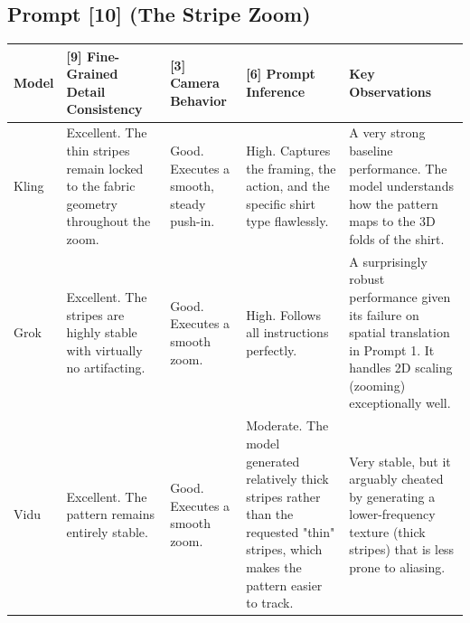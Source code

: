 \documentclass[sigconf]{acmart}
\begin{document}
\subsection*{Prompt [10] (The Stripe Zoom)}
\begin{table}[t]
    \centering
    \renewcommand{\arraystretch}{1.3}
    \begin{tabularx}{\textwidth}{| l | >{\raggedright\arraybackslash}X | >{\raggedright\arraybackslash}X | >{\raggedright\arraybackslash}X | >{\raggedright\arraybackslash}X |}
        \hline
        \textbf{Model} & \textbf{[9] Fine-Grained Detail Consistency}                                                                                                            & \textbf{[3] Camera Behavior}                                                                               & \textbf{[6] Prompt Inference}                                                                                                             & \textbf{Key Observations}                                                                                                                        \\ \hline
        Kling          & Excellent. The thin stripes remain locked to the fabric geometry throughout the zoom.                                                                   & Good. Executes a smooth, steady push-in.                                                                   & High. Captures the framing, the action, and the specific shirt type flawlessly.                                                           & A very strong baseline performance. The model understands how the pattern maps to the 3D folds of the shirt.                                     \\ \hline
        Grok           & Excellent. The stripes are highly stable with virtually no artifacting.                                                                                 & Good. Executes a smooth zoom.                                                                              & High. Follows all instructions perfectly.                                                                                                 & A surprisingly robust performance given its failure on spatial translation in Prompt 1. It handles 2D scaling (zooming) exceptionally well.      \\ \hline
        Vidu           & Excellent. The pattern remains entirely stable.                                                                                                         & Good. Executes a smooth zoom.                                                                              & Moderate. The model generated relatively thick stripes rather than the requested "thin" stripes, which makes the pattern easier to track. & Very stable, but it arguably cheated by generating a lower-frequency texture (thick stripes) that is less prone to aliasing.                     \\ \hline

\end{tabularx}
\end{table}
\end{document}
